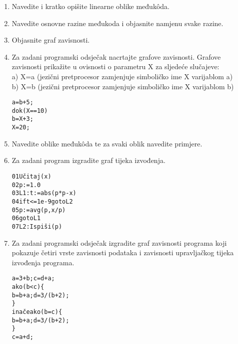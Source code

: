 \documentclass[times, 12pt, utf8]{book}
\begin{document}
\begin{enumerate}[resume]

\item
Navedite i kratko opišite linearne oblike međukôda. \cite[str.~257-259]{udzbenik}


\item
Navedite osnovne razine međukoda i objasnite namjenu svake razine. \cite[str.~254-255]{udzbenik}

\item
Objasnite graf zavisnosti. \cite[str.~260-261]{udzbenik}

\item
Za zadani programski odsječak nacrtajte grafove zavisnosti. Grafove zavisnosti prikažite u ovisnosti o parametru X za sljedeće slučajeve: \cite[str.~257-259]{udzbenik} \cite{auditorne}\\
a)	X=a (jezični pretprocesor zamjenjuje simboličko ime X varijablom a) \\
b)	X=b (jezični pretprocesor zamjenjuje simboličko ime X varijablom b)

\begin{alltt}
a = b + 5;
dok ( X == 10 )
  b = X + 3;
X = 20;
\end{alltt} 

\item
Navedite oblike međukôda te za svaki oblik navedite primjere. \cite[str.~255-261]{udzbenik}

\item
Za zadani program izgradite graf tijeka izvođenja. \cite[str.~257-259]{udzbenik} \cite{auditorne}

\begin{alltt}
01      Učitaj(x)
02      p := 1.0
03  L1: t := abs(p*p-x)
04      if t <= 1e-9 goto L2
05      p := avg(p, x/p)
06      goto L1
07  L2: Ispiši(p)
\end{alltt} 

\item
Za zadani programski odsječak izgradite graf zavisnosti programa koji pokazuje četiri vrste zavisnosti podataka i zavisnosti upravljačkog tijeka izvođenja programa. \cite[str.~257-259]{udzbenik} \cite{auditorne}

\begin{alltt}
a=3+b; c=d+a;
ako (b<c) \verb|{|
  b=b+a; d=3/(b+2);
\verb|}| 
inače ako (b=c)\verb|{|
  b=b+a; d=3/(b+2);
\verb|}|
c = a + d;
\end{alltt}


\end{enumerate}
\end{document}
